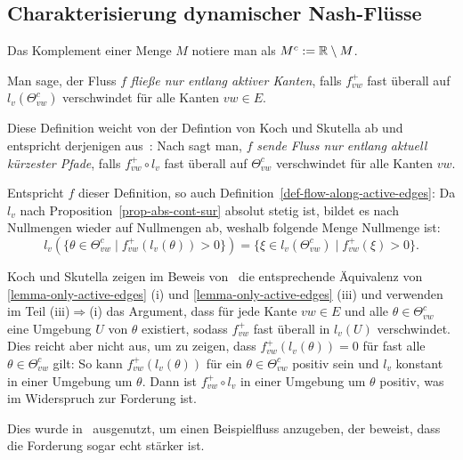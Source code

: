 \subsection{Charakterisierung dynamischer Nash-Flüsse}

\begin{notation}
	Das Komplement einer Menge $M$ notiere man als $M^c:= \mathbb{R}\setminus M$.
\end{notation}

\begin{definition}\label{def-flow-along-active-edges}
	Man sage, der Fluss $f$ \emph{fließe nur entlang aktiver Kanten}, falls $f_{vw}^+$ fast überall auf $l_v(\Theta_{vw}^c)$ verschwindet für alle Kanten $vw\in E$.
\end{definition}

\begin{remark}
	Diese Definition weicht von der Defintion von Koch und Skutella ab und entspricht derjenigen aus~\cite[Definition 1]{Cominetti2015}:
	Nach \cite[Definition 2]{Koch2011} sagt man, $f$ \emph{sende Fluss nur entlang aktuell kürzester Pfade}, falls $f_{vw}^+\circ l_v$ fast überall auf $\Theta_{vw}^c$ verschwindet für alle Kanten $vw$.
	
	Entspricht $f$ dieser Definition, so auch Definition~\ref{def-flow-along-active-edges}: 
	Da $l_v$ nach Proposition~\ref{prop-abs-cont-sur} absolut stetig ist, bildet es nach~\cite[Aufgabe 4.9]{Elstrodt2011Abs} Nullmengen wieder auf Nullmengen ab, weshalb folgende Menge Nullmenge ist: $$l_v(\{ \theta \in \Theta_{vw}^c \mid f_{vw}^+ (l_v(\theta)) > 0 \}) = \{ \xi \in l_v(\Theta_{vw}^c) \mid f_{vw}^+ (\xi) > 0 \}.$$
	 
	Koch und Skutella zeigen im Beweis von~\cite[Lemma 1]{Koch2011} die entsprechende Äquivalenz von \ref{lemma-only-active-edges} (i) und \ref{lemma-only-active-edges} (iii) und
	verwenden im Teil (iii)$\Rightarrow$(i) das Argument, dass für jede Kante $vw\in E$ und alle $\theta\in \Theta_{vw}^c$ eine Umgebung $U$ von $\theta$ existiert, sodass $f_{vw}^+$ fast überall in $l_v(U)$ verschwindet.
	Dies reicht aber nicht aus, um zu zeigen, dass $f_{vw}^+(l_v(\theta))=0$ für fast alle $\theta\in\Theta_{vw}^c$ gilt:
	So kann $f_{vw}^+(l_v(\theta))$ für ein $\theta\in\Theta_{vw}^c$ positiv sein und $l_v$ konstant in einer Umgebung um $\theta$.
	Dann ist $f_{vw}^+ \circ l_v$ in einer Umgebung um $\theta$ positiv, was im Widerspruch zur Forderung ist.
	
	Dies wurde in~\cite[Example 2]{Cominetti2015} ausgenutzt, um einen Beispielfluss anzugeben, der beweist, dass die Forderung sogar echt stärker ist.
\end{remark}

